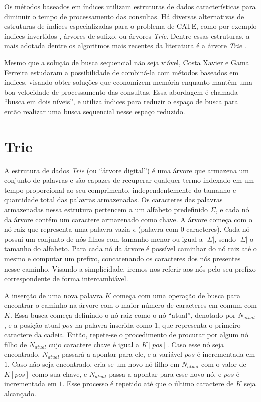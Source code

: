 Os métodos baseados em índices utilizam estruturas de dados características para diminuir o tempo de processamento das consultas. Há diversas alternativas de estruturas de índices especializadas para o problema de CATE, como por exemplo índices invertidos \citep{baezayates99}, árvores de sufixo, ou árvores \textit{Trie}. Dentre essas estruturas, a mais adotada dentre os algoritmos mais recentes da literatura é a árvore \textit{Trie} \citep{chaudhuri2009extending,ji2009efficient,li2011efficient, xiao2013efficient,deng2016meta, zhou2016beva}.

Mesmo que a solução de busca sequencial não seja viável, Costa Xavier e Gama Ferreira \citep{xavier2019, berg2020} estudaram a possibilidade de combiná-la com métodos baseados em índices, visando obter soluções que economizem memória enquanto mantêm uma boa velocidade de processamento das consultas. Essa abordagem é chamada ``busca em dois níveis'', e utiliza índices para reduzir o espaço de busca para então realizar uma busca sequencial nesse espaço reduzido.

\section{Trie}
\label{sec:trie}

A estrutura de dados \textit{Trie} (ou ``árvore digital'') é uma árvore que armazena um conjunto de palavras e são capazes de recuperar qualquer termo indexado em um tempo proporcional ao seu comprimento, independentemente do tamanho e quantidade total das palavras armazenadas. Os caracteres das palavras armazenadas nessa estrutura pertencem a um alfabeto predefinido $\Sigma$, e cada nó da árvore contém um caractere armazenado como chave. A árvore começa com o nó raiz que representa uma palavra vazia $\epsilon$ (palavra com $0$ caracteres). Cada nó possui um conjunto de nós filhos com tamanho menor ou igual a $|\Sigma|$, sendo $|\Sigma|$ o tamanho do alfabeto. Para cada nó da árvore é possível caminhar do nó raiz até o mesmo e computar um prefixo, concatenando os caracteres dos nós presentes nesse caminho. Visando a simplicidade, iremos nos referir aos nós pelo seu prefixo correspondente de forma intercambiável.

A inserção de uma nova palavra $K$ começa com uma operação de busca para encontrar o caminho na árvore com o maior número de caracteres em comum com $K$. Essa busca começa definindo o nó raiz como o nó ``atual'', denotado por $N_{atual}$, e a posição atual $pos$ na palavra inserida como $1$, que representa o primeiro caractere da cadeia. Então, repete-se o procedimento de procurar por algum nó filho de $N_{atual}$ cujo caractere chave é igual a $K[pos]$. Caso esse nó seja encontrado, $N_{atual}$ passará a apontar para ele, e a variável $pos$ é incrementada em $1$. Caso não seja encontrado, cria-se um novo nó filho em $N_{atual}$ com o valor de $K[pos]$ como sua chave, e $N_{atual}$ passa a apontar para esse novo nó, e $pos$ é incrementada em $1$. Esse processo é repetido até que o último caractere de $K$ seja alcançado.

